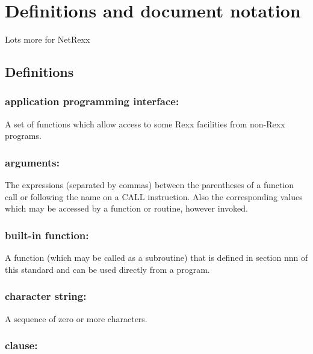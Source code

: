 \hypertarget{definitions-and-document-notation}{%
\chapter{Definitions and document
notation}\label{definitions-and-document-notation}}

Lots more for NetRexx

\hypertarget{definitions}{%
\section{Definitions}\label{definitions}}

\hypertarget{application-programming-interface}{%
\subsection{application programming
interface:}\label{application-programming-interface}}

A set of functions which allow access to some Rexx facilities from
non-Rexx programs.

\hypertarget{arguments}{%
\subsection{arguments:}\label{arguments}}

The expressions (separated by commas) between the parentheses of a
function call or following the name on a CALL instruction. Also the
corresponding values which may be accessed by a function or routine,
however invoked.

\hypertarget{built-in-function}{%
\subsection{built-in function:}\label{built-in-function}}

A function (which may be called as a subroutine) that is defined in
section nnn of this standard and can be used directly from a program.

\hypertarget{character-string}{%
\subsection{character string:}\label{character-string}}

A sequence of zero or more characters.

\hypertarget{clause}{%
\subsection{clause:}\label{clause}}

